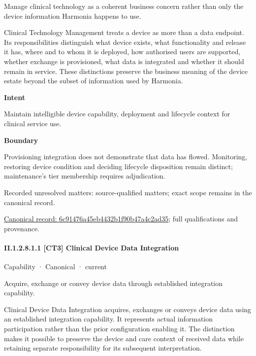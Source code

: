 Manage clinical technology as a coherent business concern rather than only the device information Harmonia happens to use.



Clinical Technology Management treats a device as more than a data endpoint. Its responsibilities distinguish what device exists, what functionality and release it has, where and to whom it is deployed, how authorised users are supported, whether exchange is provisioned, what data is integrated and whether it should remain in service. These distinctions preserve the business meaning of the device estate beyond the subset of information used by Harmonia.



\textbf{Intent}



Maintain intelligible device capability, deployment and lifecycle context for clinical service use.



\textbf{Boundary}



Provisioning integration does not demonstrate that data has flowed. Monitoring, restoring device condition and deciding lifecycle disposition remain distinct; maintenance's tier membership requires adjudication.


{\small Recorded unresolved matters: source-qualified matters; exact scope remains in the canonical record.}\par
{\footnotesize \href{../../../../../../../continuum/strategy/capability/6c91476a45eb4432b1f90b47a4c2ad35.md}{Canonical record: 6c91476a45eb4432b1f90b47a4c2ad35}; full qualifications and provenance.}\par
\paragraph*{II.1.2.8.1.1 [CT3] Clinical Device Data Integration}
\label{navigation:II.1.2.8.1.1}

\label{element:382a6fe3546f491f940cba1c1e5df5ef}
{\small Capability · Canonical · current}\par

Acquire, exchange or convey device data through established integration capability.



Clinical Device Data Integration acquires, exchanges or conveys device data using an established integration capability. It represents actual information participation rather than the prior configuration enabling it. The distinction makes it possible to preserve the device and care context of received data while retaining separate responsibility for its subsequent interpretation.



